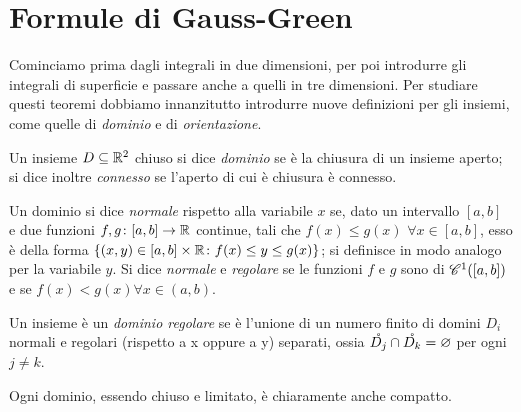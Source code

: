 \section{Formule di Gauss-Green}
Cominciamo prima dagli integrali in due dimensioni, per poi introdurre gli integrali di superficie e passare anche a quelli in tre dimensioni.
Per studiare questi teoremi dobbiamo innanzitutto introdurre nuove definizioni per gli insiemi, come quelle di \emph{dominio} e di \emph{orientazione}.
\begin{definizione} \label{d:dominio}
	Un insieme $D\subseteq\R^2$ chiuso si dice \emph{dominio} se è la chiusura di un insieme aperto; si dice inoltre \emph{connesso} se l'aperto di cui è chiusura è connesso.
\end{definizione}
\begin{definizione} \label{d:dominio-norm-reg}
	Un dominio si dice \emph{normale} rispetto alla variabile $x$ se, dato un intervallo $[a,b]$ e due funzioni $f,g\colon[a,b]\to\R$ continue, tali che $f(x)\leq g(x)$ $\forall x\in[a,b]$, esso è della forma $\{(x,y)\in[a,b]\times\R\colon f(x)\leq y\leq g(x)\}$; si definisce in modo analogo per la variabile $y$.
	Si dice \emph{normale} e \emph{regolare} se le funzioni $f$ e $g$ sono di $\cont[1]{[a,b]}$ e se $f(x)<g(x) \forall x\in(a,b)$.
\end{definizione}
\begin{definizione} \label{d:dominio-regolare}
	Un insieme è un \emph{dominio regolare} se è l'unione di un numero finito di domini $D_i$ normali e regolari (rispetto a x oppure a y) separati, ossia $\interior{D_j}\cap\interior{D_k}=\emptyset$ per ogni $j\neq k$.
\end{definizione}
Ogni dominio, essendo chiuso e limitato, è chiaramente anche compatto.

